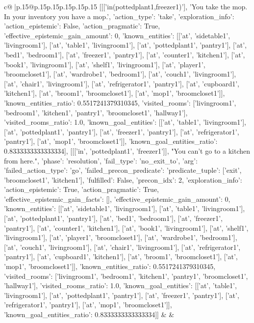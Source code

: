 \documentclass{article}
\begin{document}
{\begin{supertabular}{c@{$\;$}|p{.15\linewidth}@{}p{.15\linewidth}p{.15\linewidth}p{.15\linewidth}p{.15\linewidth}p{.15\linewidth}}
{{{	 [[['in(pottedplant1,freezer1)'], 'You take the mop. In your inventory you have a mop.', {'action_type': 'take', 'exploration_info': {'action_epistemic': False, 'action_pragmatic': True, 'effective_epistemic_gain_amount': 0, 'known_entities': [['at', 'sidetable1', 'livingroom1'], ['at', 'table1', 'livingroom1'], ['at', 'pottedplant1', 'pantry1'], ['at', 'bed1', 'bedroom1'], ['at', 'freezer1', 'pantry1'], ['at', 'counter1', 'kitchen1'], ['at', 'book1', 'livingroom1'], ['at', 'shelf1', 'livingroom1'], ['at', 'player1', 'broomcloset1'], ['at', 'wardrobe1', 'bedroom1'], ['at', 'couch1', 'livingroom1'], ['at', 'chair1', 'livingroom1'], ['at', 'refrigerator1', 'pantry1'], ['at', 'cupboard1', 'kitchen1'], ['at', 'broom1', 'broomcloset1'], ['at', 'mop1', 'broomcloset1']], 'known_entities_ratio': 0.5517241379310345, 'visited_rooms': ['livingroom1', 'bedroom1', 'kitchen1', 'pantry1', 'broomcloset1', 'hallway1'], 'visited_rooms_ratio': 1.0, 'known_goal_entities': [['at', 'table1', 'livingroom1'], ['at', 'pottedplant1', 'pantry1'], ['at', 'freezer1', 'pantry1'], ['at', 'refrigerator1', 'pantry1'], ['at', 'mop1', 'broomcloset1']], 'known_goal_entities_ratio': 0.8333333333333334}}], [[['in', 'pottedplant1', 'freezer1']], "You can't go to a kitchen from here.", {'phase': 'resolution', 'fail_type': 'no_exit_to', 'arg': {'failed_action_type': 'go', 'failed_precon_predicate': {'predicate_tuple': ['exit', 'broomcloset1', 'kitchen1'], 'fulfilled': False, 'precon_idx': 2}}, 'exploration_info': {'action_epistemic': True, 'action_pragmatic': True, 'effective_epistemic_gain_facts': [], 'effective_epistemic_gain_amount': 0, 'known_entities': [['at', 'sidetable1', 'livingroom1'], ['at', 'table1', 'livingroom1'], ['at', 'pottedplant1', 'pantry1'], ['at', 'bed1', 'bedroom1'], ['at', 'freezer1', 'pantry1'], ['at', 'counter1', 'kitchen1'], ['at', 'book1', 'livingroom1'], ['at', 'shelf1', 'livingroom1'], ['at', 'player1', 'broomcloset1'], ['at', 'wardrobe1', 'bedroom1'], ['at', 'couch1', 'livingroom1'], ['at', 'chair1', 'livingroom1'], ['at', 'refrigerator1', 'pantry1'], ['at', 'cupboard1', 'kitchen1'], ['at', 'broom1', 'broomcloset1'], ['at', 'mop1', 'broomcloset1']], 'known_entities_ratio': 0.5517241379310345, 'visited_rooms': ['livingroom1', 'bedroom1', 'kitchen1', 'pantry1', 'broomcloset1', 'hallway1'], 'visited_rooms_ratio': 1.0, 'known_goal_entities': [['at', 'table1', 'livingroom1'], ['at', 'pottedplant1', 'pantry1'], ['at', 'freezer1', 'pantry1'], ['at', 'refrigerator1', 'pantry1'], ['at', 'mop1', 'broomcloset1']], 'known_goal_entities_ratio': 0.8333333333333334}}]] 
	  } 
	   } 
	   } 
	 & & \\ 
 


\end{supertabular}}
\end{document}
